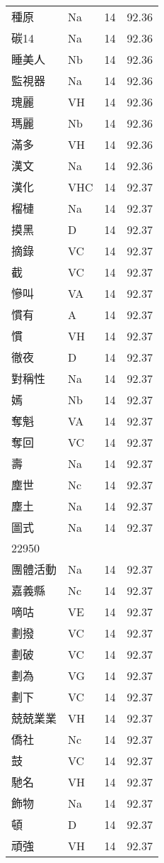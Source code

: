 \documentclass[twocolumn]{book}
\begin{document}
\begin{supertabular}{llrr}
種原 & Na & 14 &  92.36\\
碳14 & Na & 14 &  92.36\\
睡美人 & Nb & 14 &  92.36\\
監視器 & Na & 14 &  92.36\\
瑰麗 & VH & 14 &  92.36\\
瑪麗 & Nb & 14 &  92.36\\
滿多 & VH & 14 &  92.36\\
漢文 & Na & 14 &  92.36\\
漢化 & VHC & 14 &  92.37\\
榴槤 & Na & 14 &  92.37\\
摸黑 & D & 14 &  92.37\\
摘錄 & VC & 14 &  92.37\\
截 & VC & 14 &  92.37\\
慘叫 & VA & 14 &  92.37\\
慣有 & A & 14 &  92.37\\
慣 & VH & 14 &  92.37\\
徹夜 & D & 14 &  92.37\\
對稱性 & Na & 14 &  92.37\\
嫣 & Nb & 14 &  92.37\\
奪魁 & VA & 14 &  92.37\\
奪回 & VC & 14 &  92.37\\
壽 & Na & 14 &  92.37\\
塵世 & Nc & 14 &  92.37\\
塵土 & Na & 14 &  92.37\\
圖式 & Na & 14 &  92.37\\
22950\\
團體活動 & Na & 14 &  92.37\\
嘉義縣 & Nc & 14 &  92.37\\
嘀咕 & VE & 14 &  92.37\\
劃撥 & VC & 14 &  92.37\\
劃破 & VC & 14 &  92.37\\
劃為 & VG & 14 &  92.37\\
劃下 & VC & 14 &  92.37\\
兢兢業業 & VH & 14 &  92.37\\
僑社 & Nc & 14 &  92.37\\
鼓 & VC & 14 &  92.37\\
馳名 & VH & 14 &  92.37\\
飾物 & Na & 14 &  92.37\\
頓 & D & 14 &  92.37\\
頑強 & VH & 14 &  92.37\\

\end{supertabular}
\end{document}
